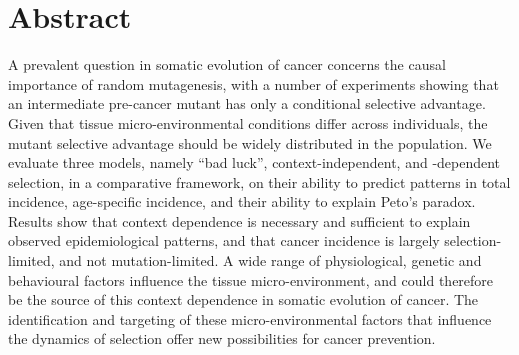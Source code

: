 \documentclass[a0,landscape]{a0poster}
\begin{document}
\color{NavyBlue} %
\large
\section*{Abstract}
	A prevalent question in somatic evolution of cancer concerns the causal importance of random mutagenesis, with a number of experiments showing that an intermediate pre-cancer mutant has only a conditional selective advantage. Given that tissue micro-environmental conditions differ across individuals, the  mutant selective advantage should be widely distributed in the population. We evaluate three models, namely ``bad luck'', context-independent, and -dependent selection, in a comparative framework, on their ability to predict patterns in total incidence, age-specific incidence, and their ability to explain Peto’s paradox. Results show that context dependence is necessary and sufficient to explain observed epidemiological patterns, and that cancer incidence is largely selection-limited, and not mutation-limited. A wide range of physiological, genetic and behavioural factors influence the tissue micro-environment, and could therefore be the source of this context dependence in somatic evolution of cancer. The identification and targeting of these micro-environmental factors that influence the dynamics of selection offer new possibilities for cancer prevention.
\end{document}
